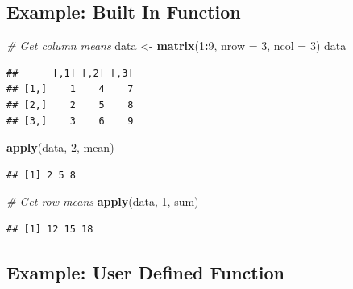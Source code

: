 \documentclass[
]{book}
\newenvironment{Shaded}{\begin{snugshade}}{\end{snugshade}}
\newcommand{\CommentTok}[1]{\textcolor[rgb]{0.56,0.35,0.01}{\textit{#1}}}
\newcommand{\DataTypeTok}[1]{\textcolor[rgb]{0.13,0.29,0.53}{#1}}
\newcommand{\DecValTok}[1]{\textcolor[rgb]{0.00,0.00,0.81}{#1}}
\newcommand{\KeywordTok}[1]{\textcolor[rgb]{0.13,0.29,0.53}{\textbf{#1}}}
\newcommand{\NormalTok}[1]{#1}
\newcommand{\OperatorTok}[1]{\textcolor[rgb]{0.81,0.36,0.00}{\textbf{#1}}}
\newcommand{\StringTok}[1]{\textcolor[rgb]{0.31,0.60,0.02}{#1}}
\begin{document}
\hypertarget{example-built-in-function}{%
\subsection*{Example: Built In Function}\label{example-built-in-function}}

\begin{Shaded}
\begin{Highlighting}[]
\CommentTok{# Get column means}
\NormalTok{data <-}\StringTok{ }\KeywordTok{matrix}\NormalTok{(}\DecValTok{1}\OperatorTok{:}\DecValTok{9}\NormalTok{, }\DataTypeTok{nrow =} \DecValTok{3}\NormalTok{, }\DataTypeTok{ncol =} \DecValTok{3}\NormalTok{)}
\NormalTok{data}
\end{Highlighting}
\end{Shaded}

\begin{verbatim}
##      [,1] [,2] [,3]
## [1,]    1    4    7
## [2,]    2    5    8
## [3,]    3    6    9
\end{verbatim}

\begin{Shaded}
\begin{Highlighting}[]
\KeywordTok{apply}\NormalTok{(data, }\DecValTok{2}\NormalTok{, mean)}
\end{Highlighting}
\end{Shaded}

\begin{verbatim}
## [1] 2 5 8
\end{verbatim}

\begin{Shaded}
\begin{Highlighting}[]
\CommentTok{# Get row means}
\KeywordTok{apply}\NormalTok{(data, }\DecValTok{1}\NormalTok{, sum)}
\end{Highlighting}
\end{Shaded}

\begin{verbatim}
## [1] 12 15 18
\end{verbatim}

\hypertarget{example-user-defined-function}{%
\subsection*{Example: User Defined Function}\label{example-user-defined-function}}
\end{document}
